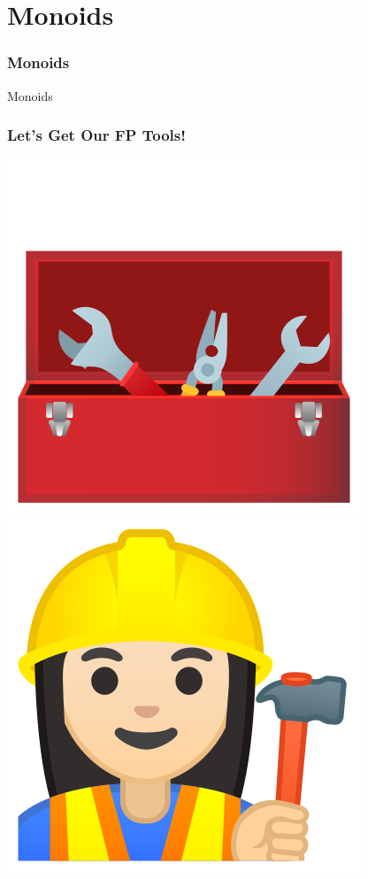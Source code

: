 \documentclass[aspectratio=169]{beamer}
\begin{document}
\section{Monoids}\label{sec:monoids}

\begin{frame}
  \frametitle{Monoids}
  \huge
  Monoids
\end{frame}

\begin{frame}
  \frametitle{Let's Get Our FP Tools!}
  \begin{center}
    \includegraphics{static-images/toolbox.png}
    \includegraphics{static-images/construction-worker.png}
  \end{center}
\end{frame}
\end{document}
